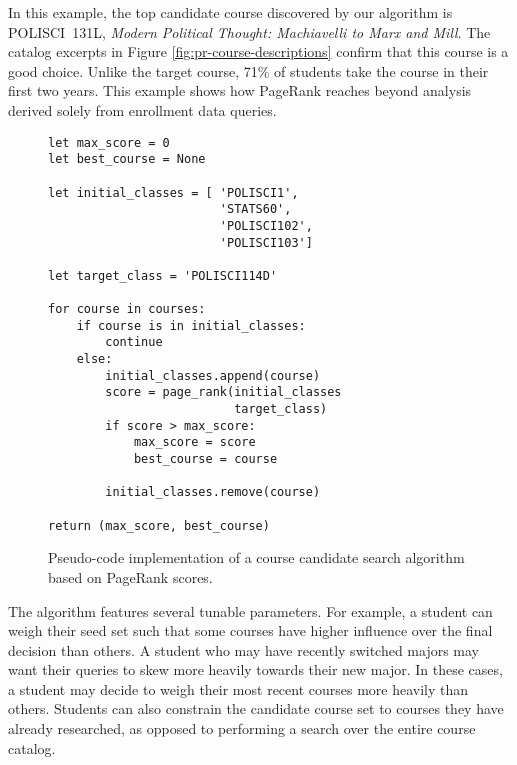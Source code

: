 In this example, the top candidate course discovered by our algorithm
is POLISCI~131L, {\em Modern Political Thought: Machiavelli to Marx
  and Mill}. The catalog excerpts in Figure
\ref{fig:pr-course-descriptions} confirm that this course is a good
choice. Unlike the target course, 71\% of students take the course in
their first two years. This example shows how PageRank reaches beyond
analysis derived solely from enrollment data queries.


\lstset{language=Python}          %

\begin{figure}
    \begin{lstlisting}[frame=single] 
let max_score = 0
let best_course = None 

let initial_classes = [ 'POLISCI1',
                        'STATS60',
                        'POLISCI102',
                        'POLISCI103']
                        
let target_class = 'POLISCI114D'

for course in courses:
    if course is in initial_classes:
        continue
    else:
        initial_classes.append(course)
        score = page_rank(initial_classes
                          target_class)
        if score > max_score:
            max_score = score
            best_course = course
        
        initial_classes.remove(course)

return (max_score, best_course)
\end{lstlisting}
\caption{Pseudo-code implementation of a course candidate search algorithm based on PageRank scores.}
\label{fig:course-recommendation-algorithm}
\end{figure}

The algorithm features several tunable parameters. For example, a
student can weigh their seed set such that some courses have higher
influence over the final decision than others. A student who may have
recently switched majors may want their queries to skew more heavily
towards their new major. In these cases, a student may decide to weigh
their most recent courses more heavily than others. Students can also
constrain the candidate course set to courses they have already
researched, as opposed to performing a search over the entire course
catalog.
